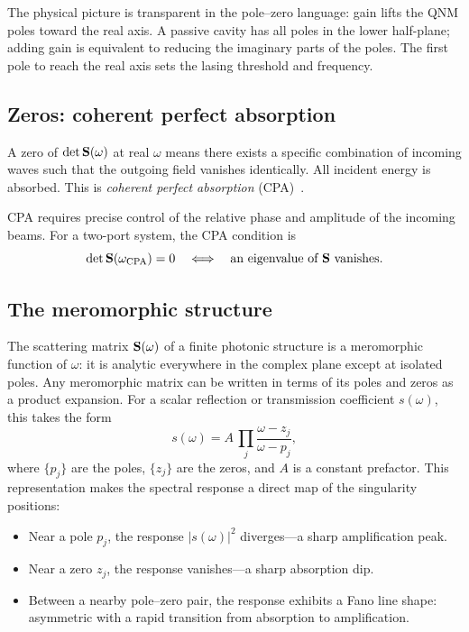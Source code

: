 The physical picture is transparent in the pole--zero language: gain lifts
the QNM poles toward the real axis. A passive cavity has all poles in the
lower half-plane; adding gain is equivalent to reducing the imaginary parts
of the poles. The first pole to reach the real axis sets the lasing
threshold and frequency.

\subsection{Zeros: coherent perfect absorption}
\label{ssec:cpa-zeros}

A zero of $\det\mathbf{S}(\omega)$ at real $\omega$ means there exists a
specific combination of incoming waves such that the outgoing field
vanishes identically. All incident energy is absorbed. This is
\emph{coherent perfect absorption} (CPA)~\cite{chong2010symmetry}.

CPA requires precise control of the relative phase and amplitude of the
incoming beams. For a two-port system, the CPA condition is
\begin{equation}
 \det\mathbf{S}(\omega_{\mathrm{CPA}}) = 0
 \quad\Longleftrightarrow\quad
 \text{an eigenvalue of } \mathbf{S} \text{ vanishes}.
 \label{eq:cpa-condition}
\end{equation}

\subsection{The meromorphic structure}
\label{ssec:meromorphic}

The scattering matrix $\mathbf{S}(\omega)$ of a finite photonic structure is a
meromorphic function of $\omega$: it is analytic everywhere in the complex
plane except at isolated poles. Any meromorphic matrix can be written in
terms of its poles and zeros as a product expansion. For a scalar
reflection or transmission coefficient $s(\omega)$, this takes the form
\begin{equation}
 s(\omega) = A\,\prod_j \frac{\omega - z_j}{\omega - p_j},
 \label{eq:pole-zero-product}
\end{equation}
where $\{p_j\}$ are the poles, $\{z_j\}$ are the zeros, and $A$ is a
constant prefactor. This representation makes the spectral response a
direct map of the singularity positions:
\begin{itemize}
 \item Near a pole $p_j$, the response $|s(\omega)|^2$ diverges---a
 sharp amplification peak.
 \item Near a zero $z_j$, the response vanishes---a sharp absorption dip.
 \item Between a nearby pole--zero pair, the response exhibits a Fano
 line shape: asymmetric with a rapid transition from absorption to
 amplification.
\end{itemize}


